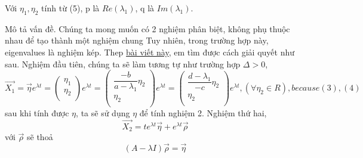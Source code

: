 \documentclass[class=article, crop=false]{standalone}
\begin{document}
    \begin{center}
        Với
        $\eta_1, \eta_2$ tính từ (5),
        p là $Re(\lambda_1)$,
        q là $Im(\lambda_1)$.
    \end{center}


    Mô tả vấn đề.
    Chúng ta mong muốn có 2 nghiệm phân biệt, không phụ thuộc nhau để tạo thành một nghiệm chung
    Tuy nhiên, trong trường hợp này, eigenvalues là nghiệm kép.
    Thep \href{https://tutorial.math.lamar.edu/Classes/DE/RepeatedEigenvalues.aspx}{bài viết này}, em tìm được cách giải quyết như sau.
    \newline
    \newline
    Nghiệm đầu tiên, chúng ta sẽ làm tương tự như trường hợp $\Delta > 0$,
    \begin{equation}
        \vec{X_1} = \vec{\eta} e^{\lambda t} =
        \begin{pmatrix}
            \eta_1 \\
            \eta_2 \\
        \end{pmatrix}
        e^{\lambda t}
        =
        \begin{pmatrix}
            \dfrac{-b}{a-\lambda_1}\eta_2 \\
            \eta_2 \\
        \end{pmatrix}
        e^{\lambda t}
        =
        \begin{pmatrix}
            \dfrac{d - \lambda_1}{-c}\eta_2 \\
            \eta_2 \\
        \end{pmatrix}
        e^{\lambda t}
        , (\forall \eta_2 \in R), because (3), (4)\label{eq:equation8}
    \end{equation}
    sau khi tính được $\eta$, ta sẽ sử dụng $\eta$ để tính nghiệm 2.
    \newline
    \newline
    Nghiệm thứ hai,
    \begin{equation}
        \vec{X_2} = t e^{\lambda t} \vec{\eta} + e^{\lambda t}\vec{\rho}\label{eq:equation6}
    \end{equation}
    \newline
    \newline
    \newline
    với $\vec{\rho}$ sẽ thoả
    \begin{equation*}
        (A - \lambda I) \vec{\rho} = \vec{\eta}
    \end{equation*}
\end{document}
